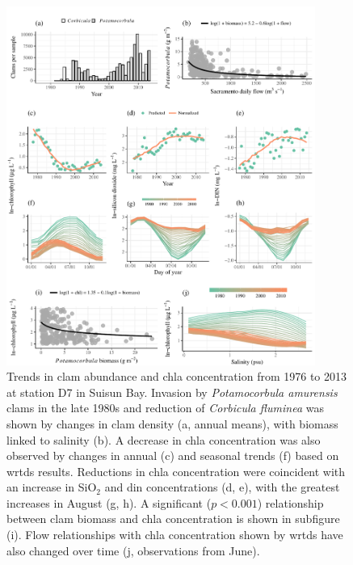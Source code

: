 \documentclass[letterpaper,12pt,oneside]{article}\usepackage[]{graphicx}\usepackage[]{color}
\begin{document}
\begin{figure}[!ht]

{\centering \includegraphics[width=0.9\textwidth]{figs/clmchl-1} 

}

\caption{Trends in clam abundance and \ac{chla} concentration from 1976 to 2013 at station D7 in Suisun Bay.  Invasion by \textit{Potamocorbula amurensis} clams in the late 1980s and reduction of \textit{Corbicula fluminea} was shown by changes in clam density (a, annual means), with biomass linked to salinity (b).  A decrease in \ac{chla} concentration was also observed by changes in annual (c) and seasonal trends (f) based on \ac{wrtds} results.  Reductions in \ac{chla} concentration were coincident with an increase in SiO$_2$ and \ac{din} concentrations (d, e), with the greatest increases in August (g, h). A significant ($p < 0.001$) relationship between clam biomass and \ac{chla} concentration is shown in subfigure (i).  Flow relationships with \ac{chla} concentration shown by \ac{wrtds} have also changed over time (j, observations from June).}\label{fig:clmchl}
\end{figure}



\clearpage
\end{document}
